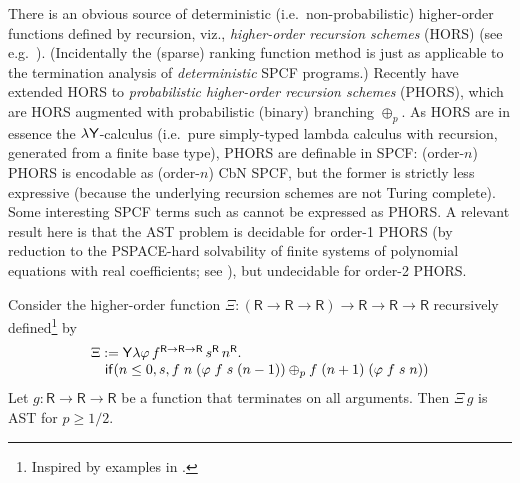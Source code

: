There is an obvious source of deterministic (i.e.~non-probabilistic) higher-order functions defined by recursion, viz., \emph{higher-order recursion schemes} (HORS) (see e.g.~\citep{DBLP:conf/lics/Ong06,DBLP:conf/lics/Ong15}).
(Incidentally the (sparse) ranking function method is just as applicable to the termination analysis of \emph{deterministic} SPCF programs.)
Recently \cite{DBLP:conf/lics/KobayashiLG19} have extended HORS to \emph{probabilistic higher-order recursion schemes} (PHORS), which are HORS augmented with probabilistic (binary) branching $\oplus_p$.
As HORS are in essence the $\lambda \mathsf{Y}$-calculus \cite{DBLP:conf/lics/Statman02} (i.e.~pure simply-typed lambda calculus with recursion, generated from a finite base type), PHORS are definable in SPCF:
(order-$n$) PHORS is encodable as (order-$n$) CbN SPCF, but the former is strictly less expressive (because the underlying recursion schemes are not Turing complete). 
Some interesting SPCF terms such as  %
cannot be expressed as PHORS.
A relevant result here is that the AST problem is decidable for order-1 PHORS (by reduction to the PSPACE-hard solvability of finite systems of polynomial equations with real coefficients; see \citep{DBLP:journals/jacm/EtessamiY09}), but undecidable for order-2 PHORS.

\begin{example}
Consider the higher-order function
$\Xi : (\textsf{R} \to \textsf{R} \to \textsf{R}) \to \textsf{R} \to \textsf{R} \to \textsf{R}$
recursively defined\footnote{Inspired by examples in \citep{DBLP:journals/pacmpl/BurnOR18,DBLP:conf/lics/OngW19}.} by
\[
\begin{array}{l}
\Xi := \mathsf{Y} \lambda \varphi \, f^{\textsf{R} \to \textsf{R} \to \textsf{R}} \, s^\textsf{R} \, n^\textsf{R} . \\
\quad\mathsf{if}(n \leq 0, s, 
f \; n \; (\varphi \; f \; s \; (n - 1))
\oplus_p
f \; (n+1) \; (\varphi \; f \; s \; n)
)
\end{array}
\]
Let $g : \textsf{R} \to \textsf{R} \to \textsf{R}$ be a function that terminates on all arguments.
Then $\Xi \, g$ is AST for $p \geq 1/2$.
\end{example}
